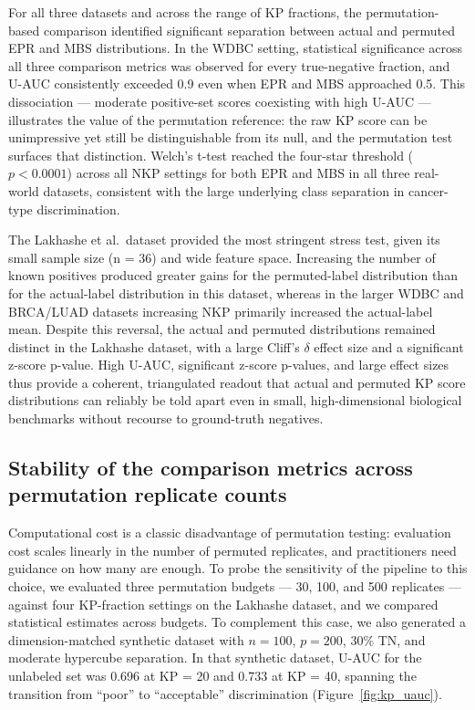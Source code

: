 \documentclass[11pt]{article}
\begin{document}
For all three datasets and across the range of KP fractions, the permutation-based comparison identified significant separation between actual and permuted EPR and MBS distributions. In the WDBC setting, statistical significance across all three comparison metrics was observed for every true-negative fraction, and U-AUC consistently exceeded 0.9 even when EPR and MBS approached 0.5. This dissociation --- moderate positive-set scores coexisting with high U-AUC --- illustrates the value of the permutation reference: the raw KP score can be unimpressive yet still be distinguishable from its null, and the permutation test surfaces that distinction. Welch's t-test reached the four-star threshold ($p < 0.0001$) across all NKP settings for both EPR and MBS in all three real-world datasets, consistent with the large underlying class separation in cancer-type discrimination.

The Lakhashe et al.\ dataset provided the most stringent stress test, given its small sample size (n = 36) and wide feature space. Increasing the number of known positives produced greater gains for the permuted-label distribution than for the actual-label distribution in this dataset, whereas in the larger WDBC and BRCA/LUAD datasets increasing NKP primarily increased the actual-label mean. Despite this reversal, the actual and permuted distributions remained distinct in the Lakhashe dataset, with a large Cliff's $\delta$ effect size and a significant z-score p-value. High U-AUC, significant z-score p-values, and large effect sizes thus provide a coherent, triangulated readout that actual and permuted KP score distributions can reliably be told apart even in small, high-dimensional biological benchmarks without recourse to ground-truth negatives.

\subsection{Stability of the comparison metrics across permutation replicate counts}

Computational cost is a classic disadvantage of permutation testing: evaluation cost scales linearly in the number of permuted replicates, and practitioners need guidance on how many are enough. To probe the sensitivity of the pipeline to this choice, we evaluated three permutation budgets --- 30, 100, and 500 replicates --- against four KP-fraction settings on the Lakhashe dataset, and we compared statistical estimates across budgets. To complement this case, we also generated a dimension-matched synthetic dataset with $n = 100$, $p = 200$, 30\% TN, and moderate hypercube separation. In that synthetic dataset, U-AUC for the unlabeled set was 0.696 at KP = 20 and 0.733 at KP = 40, spanning the transition from ``poor'' to ``acceptable'' discrimination (Figure~\ref{fig:kp_uauc}).
\end{document}
